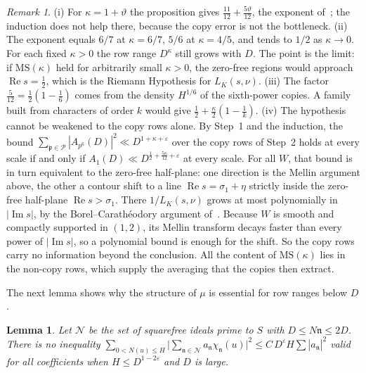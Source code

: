 \documentclass[11pt]{article}
\newtheorem{lemma}[proposition]{Lemma}
\theoremstyle{remark}
\newtheorem{remark}[proposition]{Remark}
\begin{document}
\begin{remark}
(i) For $\kappa=1+\vartheta$ the proposition gives $\frac{11}{12}+\frac{5\vartheta}{12}$,
the exponent of~\cite{OAI}; the induction does not help there, because the copy error is
not the bottleneck. (ii) The exponent equals $6/7$ at $\kappa=6/7$, $5/6$ at
$\kappa=4/5$, and tends to $1/2$ as $\kappa\to0$. For each fixed $\kappa>0$ the row range
$D^\kappa$ still grows with $D$. The point is the limit: if $\mathrm{MS}(\kappa)$ held for
arbitrarily small $\kappa>0$, the zero-free regions would approach $\operatorname{Re}s=\frac12$,
which is the Riemann Hypothesis for $L_K(s,\nu)$. (iii) The
factor $\frac5{12}=\frac12(1-\frac16)$ comes from the density $H^{1/6}$ of the sixth-power
copies. A family built from characters of order $k$ would give
$\frac12+\frac\kappa2(1-\frac1k)$. (iv) The hypothesis cannot be weakened to the copy rows
alone. By Step~1 and the induction, the bound
$\sum_{\mathfrak p\in\mathcal P}|A_{p^6}(D)|^2\ll D^{1+\kappa+\varepsilon}$ over the copy rows of
Step~2 holds at every scale if and only if $A_1(D)\ll D^{\frac12+\frac{5\kappa}{12}+\varepsilon}$
at every scale. For all $W$, that bound is in turn equivalent to the zero-free half-plane:
one direction is the Mellin argument above, the other a contour shift to a line
$\operatorname{Re}s=\sigma_1+\eta$ strictly inside the zero-free half-plane
$\operatorname{Re}s>\sigma_1$. There $1/L_K(s,\nu)$ grows at most polynomially in $|\operatorname{Im}s|$, by the
Borel--Carath\'eodory argument of~\cite[\S14.2]{Titchmarsh}. Because $W$ is smooth and compactly
supported in $(1,2)$, its Mellin transform decays faster than every power of $|\operatorname{Im}s|$,
so a polynomial bound is enough for the shift. So the copy rows carry no
information beyond the conclusion. All the content of $\mathrm{MS}(\kappa)$ lies in the
non-copy rows, which supply the averaging that the copies then extract.
\end{remark}

The next lemma shows why the structure of $\mu$ is essential for row ranges below $D$.

\begin{lemma}\label{lem:general}
Let $\mathcal N$ be the set of squarefree ideals prime to $S$ with $D\le N\mathfrak n\le2D$.
There is no inequality
$\sum_{0<N(u)\le H}\big|\sum_{\mathfrak n\in\mathcal N}a_{\mathfrak n}\chi_{\mathfrak n}(u)\big|^2
\le C\,D^{\varepsilon}H\sum|a_{\mathfrak n}|^2$ valid for all coefficients when
$H\le D^{1-2\varepsilon}$ and $D$ is large.
\end{lemma}
\end{document}
